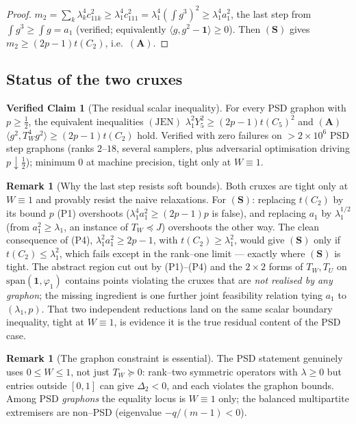 \documentclass[11pt]{article}
\theoremstyle{definition}
\newtheorem{vclaim}[theorem]{Verified Claim}
\newtheorem{remark}[theorem]{Remark}
\newcommand{\one}{\mathbf 1}
\newcommand{\tw}{T_W}
\newcommand{\tu}{T_U}
\begin{document}
\begin{proof}
$m_2=\sum_k\lambda_k^4 c_{11k}^2\ge\lambda_1^4 c_{111}^2=\lambda_1^4(\int g^3)^2
\ge\lambda_1^4 a_1^2$, the last step from $\int g^3\ge\int g=a_1$ (verified;
equivalently $\langle g,g^2-\one\rangle\ge0$).  Then $(\mathbf S)$ gives
$m_2\ge(2p-1)t(C_2)$, i.e.\ $(\mathbf A)$.
\end{proof}

\subsection{Status of the two cruxes}

\begin{vclaim}[The residual scalar inequality]\label{vc:crux}
For every PSD graphon with $p\ge\tfrac12$, the equivalent inequalities
$(\mathrm{JEN})$ $\lambda_1^2Y_5^2\ge(2p-1)t(C_5)^2$ and $(\mathbf A)$
$\langle g^2,\tw^4 g^2\rangle\ge(2p-1)t(C_2)$ hold.  Verified with zero failures
on $>2\times10^6$ PSD step graphons (ranks $2$--$18$, several samplers, plus
adversarial optimisation driving $p\downarrow\tfrac12$); minimum $0$ at machine
precision, tight only at $W\equiv1$.
\end{vclaim}

\begin{remark}[Why the last step resists soft bounds]
Both cruxes are tight only at $W\equiv1$ and provably resist the naive
relaxations.  For $(\mathbf S)$: replacing $t(C_2)$ by its bound $p$ (P1)
overshoots ($\lambda_1^4 a_1^2\ge(2p-1)p$ is false), and replacing $a_1$ by
$\lambda_1^{1/2}$ (from $a_1^2\ge\lambda_1$, an instance of $\tw\preceq J$)
overshoots the other way.  The clean consequence of (P4),
$\lambda_1^2a_1^2\ge2p-1$, with $t(C_2)\ge\lambda_1^2$, would give $(\mathbf S)$
only if $t(C_2)\le\lambda_1^2$, which fails except in the rank--one limit ---
exactly where $(\mathbf S)$ is tight.  The abstract region cut out by
(P1)--(P4) and the $2\times2$ forms of $\tw,\tu$ on $\mathrm{span}(\one,\varphi_1)$
contains points violating the cruxes that are \emph{not realised by any graphon};
the missing ingredient is one further joint feasibility relation tying $a_1$ to
$(\lambda_1,p)$.  That two independent reductions land on the same scalar boundary
inequality, tight at $W\equiv1$, is evidence it is the true residual content of
the PSD case.
\end{remark}

\begin{remark}[The graphon constraint is essential]
The PSD statement genuinely uses $0\le W\le1$, not just $\tw\succeq0$: rank--two
symmetric operators with $\lambda\ge0$ but entries outside $[0,1]$ can give
$\Delta_2<0$, and each violates the graphon bounds.  Among PSD \emph{graphons} the
equality locus is $W\equiv1$ only; the balanced multipartite extremisers are
non--PSD (eigenvalue $-q/(m-1)<0$).
\end{remark}
\end{document}
